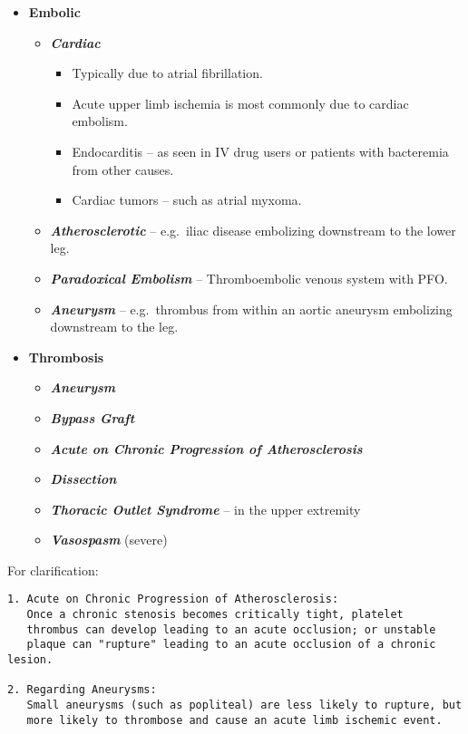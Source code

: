 \documentclass[
]{book}
\begin{document}
\begin{itemize}
\item
  \textbf{Embolic}

  \begin{itemize}
  \item
    \textbf{\emph{Cardiac}}

    \begin{itemize}
    \item
      Typically due to atrial fibrillation.
    \item
      Acute upper limb ischemia is most commonly due to cardiac embolism.~
    \item
      Endocarditis -- as seen in IV drug users or patients with
      bacteremia from other causes.
    \item
      Cardiac tumors -- such as atrial myxoma.
    \end{itemize}
  \item
    \textbf{\emph{Atherosclerotic}} -- e.g.~iliac disease embolizing downstream to the
    lower leg.
  \item
    \textbf{\emph{Paradoxical Embolism}} -- Thromboembolic venous system with PFO.~
  \item
    \textbf{\emph{Aneurysm}} -- e.g.~thrombus from within an aortic aneurysm
    embolizing downstream to the leg.
  \end{itemize}
\item
  \textbf{Thrombosis}

  \begin{itemize}
  \item
    \textbf{\emph{Aneurysm}}
  \item
    \textbf{\emph{Bypass Graft}}
  \item
    \textbf{\emph{Acute on Chronic Progression of Atherosclerosis}}
  \item
    \textbf{\emph{Dissection}}
  \item
    \textbf{\emph{Thoracic Outlet Syndrome}} -- in the upper extremity
  \item
    \textbf{\emph{Vasospasm}} (severe)
  \end{itemize}
\end{itemize}

For clarification:

\begin{verbatim}
1. Acute on Chronic Progression of Atherosclerosis: 
   Once a chronic stenosis becomes critically tight, platelet
   thrombus can develop leading to an acute occlusion; or unstable 
   plaque can "rupture" leading to an acute occlusion of a chronic lesion.
   
2. Regarding Aneurysms:
   Small aneurysms (such as popliteal) are less likely to rupture, but 
   more likely to thrombose and cause an acute limb ischemic event.
\end{verbatim}
\end{document}
